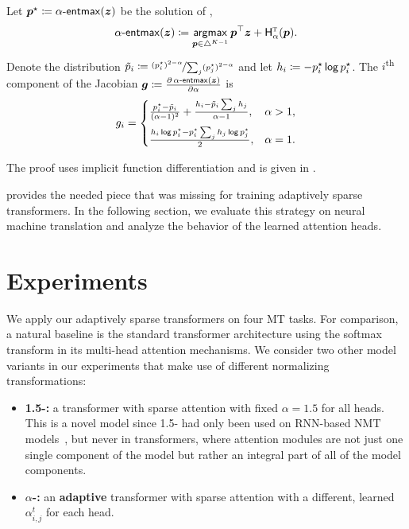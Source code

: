 \begin{proposition}\label{prop:grad_alpha}%
    Let $\bm{p}^\star \coloneqq \mathop{\mathsf{\alpha}\textnormal{-}\mathsf{entmax}}(\bm{z})$ be the solution of
    ,
    \begin{equation}
        \mathop{\mathsf{\alpha}\textnormal{-}\mathsf{entmax}}(\bm{z}) \coloneqq
        \operatorname*{\mathsf{argmax}}_{\bm{p} \in \triangle^{K-1}} \bm{p}^\top\bm{z} + \mathsf{H}^{{\textsc{t}}}_{\alpha}(\bm{p}).
    \end{equation}
    Denote the distribution $\tilde{p}_i \coloneqq \nicefrac{(p_i^\star)^{2 - \alpha}}{
            \sum_j(p_j^\star)^{2-\alpha}}$ and let
    $h_i \coloneqq -p^\star_i \operatorname*{\mathsf{log}} p^\star_i$.
    The $i$\textsuperscript{th} component of the Jacobian
    $\bm{g} \coloneqq \frac{\partial \mathop{\mathsf{\alpha}\textnormal{-}\mathsf{entmax}}(\bm{z})}{\partial \alpha}$ is
    \begin{equation}\label{eq:final_gradient_alpha}
        g_i =%
        \begin{cases}
            \frac{p_i^{\star} - \tilde{\pp}_i}{(\alpha-1)^2} +
            \frac{h_i - \tilde{\pp}_i%
                \sum_j h_j%
            }{\alpha-1},                                                                  & \alpha > 1, \\[1.5ex]
            \frac{h_i \log \pp_i^{\star} - \pp_i^{\star} \sum_j h_j \log p_j^{\star}}{2}, & \alpha = 1.
        \end{cases}
    \end{equation}
\end{proposition}
\noindent%
The proof uses implicit function differentiation and is given in .

 provides the needed piece that was missing
for training adaptively sparse transformers. In the
following section, we evaluate this strategy on neural machine
translation and analyze the behavior of the learned attention heads.

\section{Experiments}

\noindent We apply our adaptively sparse transformers on four MT tasks.
For comparison, a natural baseline is the standard transformer
architecture using the softmax transform in its multi-head attention mechanisms.
We consider two other model variants in our experiments that make use of different
normalizing transformations:

\begin{itemize}
    \item \textbf{1.5-\entmaxtext:} a transformer with sparse \entmaxtext
          attention with fixed $\alpha=1.5$ for all heads. This is a novel model
          since 1.5-\entmaxtext{} had only been used on
          RNN-based NMT models~\citep{entmax}, but never
          in transformers, where attention modules are not just one single
          component of the model but rather an integral part of all of
          the model components.%
    \item \textbf{\boldmath $\alpha$-\entmaxtext:} an \textbf{adaptive}
          transformer with sparse \entmaxtext attention with a different,
          learned $\alpha_{i,j}^t$ for each head.
\end{itemize}

